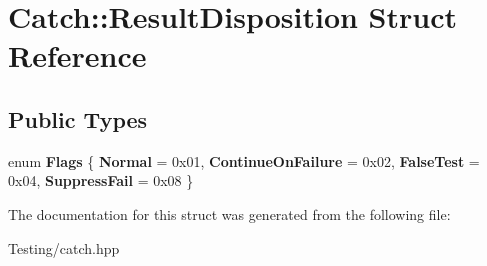 \hypertarget{struct_catch_1_1_result_disposition}{\section{Catch\-:\-:Result\-Disposition Struct Reference}
\label{struct_catch_1_1_result_disposition}
}
\subsection*{Public Types}
\begin{DoxyCompactItemize}
\item 
enum {\bfseries Flags} \{ {\bfseries Normal} = 0x01, 
{\bfseries Continue\-On\-Failure} = 0x02, 
{\bfseries False\-Test} = 0x04, 
{\bfseries Suppress\-Fail} = 0x08
 \}
\end{DoxyCompactItemize}


The documentation for this struct was generated from the following file\-:\begin{DoxyCompactItemize}
\item 
Testing/catch.\-hpp\end{DoxyCompactItemize}
